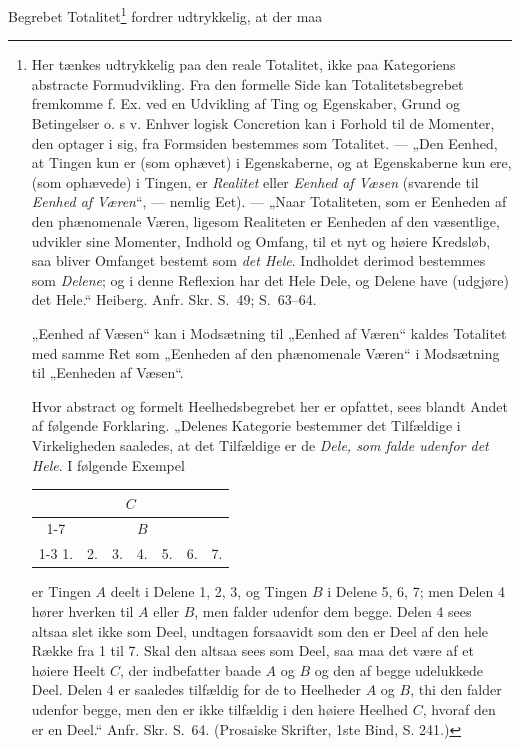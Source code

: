 \documentclass[11pt]{book}
\begin{document}
Begrebet Totalitet\footnote{Her tænkes udtrykkelig paa den reale Totalitet,
ikke paa Kategoriens abstracte Formudvikling. Fra den formelle Side kan
Totalitetsbegrebet fremkomme f. Ex. ved en Udvikling af Ting og Egenskaber,
Grund og Betingelser o. s v. Enhver logisk Concretion kan i Forhold til de
Momenter, den optager i sig, fra Formsiden bestemmes som Totalitet. --- „Den
Eenhed, at Tingen kun er (som ophævet) i Egenskaberne, og at Egenskaberne kun
ere, (som ophævede) i Tingen, er \emph{Realitet} eller \emph{Eenhed af Væsen}
(svarende til \emph{Eenhed af Væren}“, --- nemlig Eet). --- „Naar
Totaliteten, som er Eenheden af den phænomenale Væren, ligesom Realiteten er
Eenheden af den væsentlige, udvikler sine Momenter, Indhold og
Omfang, til et nyt og høiere Kredsløb, saa bliver Omfanget bestemt som
\emph{det Hele}. Indholdet derimod bestemmes som \emph{Delene}; og i denne
Reflexion har det Hele Dele, og Delene have (udgjøre) det Hele.“ Heiberg.
Anfr. Skr. S.\ 49; S.\ 63--64.

„Eenhed af Væsen“ kan i Modsætning til „Eenhed af Væren“ kaldes Totalitet med
samme Ret som „Eenheden af den phænomenale Væren“ i Modsætning til „Eenheden
af Væsen“.

Hvor abstract og formelt Heelhedsbegrebet her er opfattet, sees blandt Andet
af følgende Forklaring. „Delenes Kategorie bestemmer det Tilfældige i
Virkeligheden saaledes, at det Tilfældige er de \emph{Dele, som falde udenfor
det Hele}. I følgende Exempel
\begin{center}
\begin{tabular}{@{}c@{~}c@{~}c@{~}c@{~}c@{~}c@{~}c@{}}
\multicolumn{7}{c}{$C$}\\
\cline{1-7}
\multicolumn{3}{c}{$A$} & & \multicolumn{3}{c}{$B$}\\
\cline{1-3}\cline{5-7}
1. & 2. & 3. & 4. & 5. & 6. & 7.
\end{tabular}
\end{center}
er Tingen $A$ deelt i Delene 1, 2, 3, og Tingen $B$ i Delene 5, 6, 7; men
Delen 4 hører hverken til $A$ eller $B$, men falder udenfor dem begge. Delen
4 sees altsaa slet ikke som Deel, undtagen forsaavidt som den er Deel af den
hele Række fra 1 til 7. Skal den altsaa sees som Deel, saa maa det være af et
høiere Heelt $C$, der indbefatter baade $A$ og $B$ og den af begge udelukkede
Deel. Delen 4 er saaledes tilfældig for de to Heelheder $A$ og $B$, thi den
falder udenfor begge, men den er ikke tilfældig i den høiere Heelhed $C$,
hvoraf den er en Deel.“ Anfr. Skr. S.\ 64. (Prosaiske Skrifter, 1ste Bind, S.
241.)} fordrer udtrykkelig, at der maa
\end{document}

